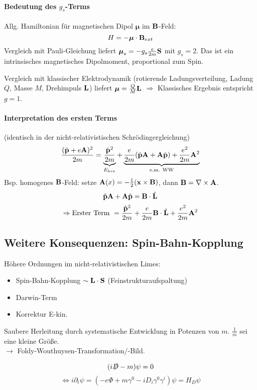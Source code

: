 \documentclass[11pt,a4paper]{report}
\renewcommand{\vec}{\boldsymbol}
\begin{document}
\paragraph{Bedeutung des $g_s$-Terms} Allg. Hamiltonian für magnetischen Dipol $\vec{\mu}$ im $\mathbf{B}$-Feld:
$$H = -\vec{\mu}\cdot\vf{B}_{ext}$$
Vergleich mit Pauli-Gleichung liefert $\vec{\mu}_s = -g_s\frac{e}{2m}\vf{S}$ mit $g_s = 2$. Das ist ein intrinsisches magnetisches Dipolmoment, proportional zum Spin.\par 

Vergleich mit klassischer Elektrodynamik (rotierende Ladungsverteilung, Ladung $Q$, Masse $M$, Drehimpuls $\mathbf{L}$) liefert $\vec{\mu}=\frac{Q}{M}\vf{L}$ $\Rightarrow$ Klassisches Ergebnis entspricht $g=1$.

\paragraph{Interpretation des ersten Terms} (identisch in der nicht-relativistischen Schrödingergleichung)
$$\frac{(\hat{\mathbf{p}}+e\mathbf{A})^2}{2m}=\underbrace{\frac{\hat{\mathbf{p}}^2}{2m}}_{E_{kin}}+\underbrace{\frac{e}{2m}(\hat{\mathbf{p}}\mathbf{A}+\mathbf{A}\hat{\mathbf{p}})+\frac{e^2}{2m}\mathbf{A}^2}_{\text{e.m. WW}}$$
Bsp. homogenes $\mathbf{B}$-Feld: setze $\mathbf{A}(x)=-\frac{1}{2}(\mathbf{x}\times\mathbf{B})$, dann $\mathbf{B}=\nabla\times\mathbf{A}$.
$$\hat{\mathbf{p}}\mathbf{A}+\mathbf{A}\hat{\mathbf{p}}=\mathbf{B}\cdot\hat{\mathbf{L}}$$
$$\Rightarrow \text{Erster Term } = \frac{\hat{\mathbf{p}}^2}{2m} +\frac{e}{2m}\mathbf{B}\cdot\hat{\mathbf{L}}+\frac{e^2}{2m}\mathbf{A}^2$$

\subsection{Weitere Konsequenzen: Spin-Bahn-Kopplung}

Höhere Ordnungen im nicht-relativistischen Limes:
\begin{itemize}
\item Spin-Bahn-Kopplung $\sim\mathbf{L}\cdot\mathbf{S}$ (Feinstrukturaufspaltung)
\item Darwin-Term
\item Korrektur E-kin. 
\end{itemize}

Saubere Herleitung durch systematische Entwicklung in Potenzen von $m$. $\frac{1}{m}$ sei eine kleine Größe. \\ $\rightarrow$ Foldy-Wouthuysen-Transformation/-Bild.

$$(i\slashed{D}-m)\psi = 0$$
$$\Leftrightarrow i\partial_t\psi = (-e\Phi + m\gamma^0 - iD_i\gamma^0\gamma^i)\psi = H_D\psi$$
\end{document}
